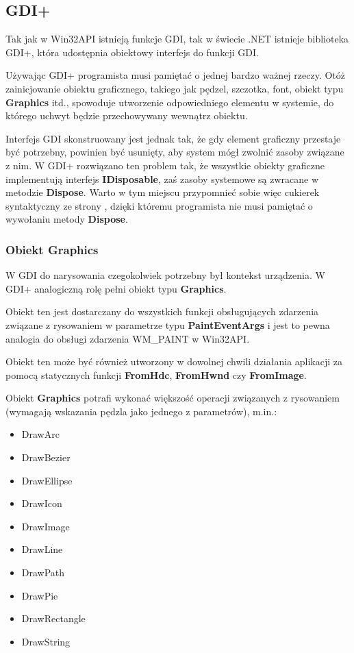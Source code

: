 ﻿\subsection{GDI+}

Tak jak w Win32API istnieją funkcje GDI, tak w świecie .NET istnieje biblioteka GDI+, która
udostępnia obiektowy interfejs do funkcji GDI. 

Używając GDI+ programista musi pamiętać o jednej bardzo ważnej rzeczy. Otóż zainicjowanie obiektu
graficznego, takiego jak pędzel, szczotka, font, obiekt typu {\bf Graphics} itd., spowoduje
utworzenie odpowiedniego elementu w systemie, do którego uchwyt będzie przechowywany wewnątrz obiektu.

Interfejs GDI skonstruowany jest jednak tak, że gdy element graficzny przestaje być potrzebny, powinien
być usunięty, aby system mógł zwolnić zasoby związane z nim. W GDI+ rozwiązano ten problem tak, że
wszystkie obiekty graficzne implementują interfejs {\bf IDisposable}, zaś zasoby systemowe są
zwracane w metodzie {\bf Dispose}. Warto w tym miejscu przypomnieć sobie więc cukierek syntaktyczny
ze strony \pageref{disposeSyntaxSugar}, dzięki któremu programista nie musi pamiętać o wywołaniu
metody {\bf Dispose}.

\subsubsection{Obiekt {\bf Graphics}}

W GDI do narysowania czegokolwiek potrzebny był kontekst urządzenia. W GDI+ analogiczną rolę pełni
obiekt typu {\bf Graphics}. 

Obiekt ten jest dostarczany do wszystkich funkcji obsługujących
zdarzenia związane z rysowaniem w parametrze typu {\bf PaintEventArgs} i jest to pewna analogia
do obsługi zdarzenia WM\_PAINT w Win32API.

Obiekt ten może być również utworzony w dowolnej chwili działania aplikacji za pomocą statycznych funkcji
{\bf FromHdc}, {\bf FromHwnd} czy {\bf FromImage}.

Obiekt {\bf Graphics} potrafi wykonać większość operacji związanych z rysowaniem (wymagają wskazania
pędzla jako jednego z parametrów), m.in.:

\begin{itemize}
\item DrawArc
\item DrawBezier
\item DrawEllipse
\item DrawIcon
\item DrawImage
\item DrawLine
\item DrawPath
\item DrawPie
\item DrawRectangle
\item DrawString
\end{itemize}

